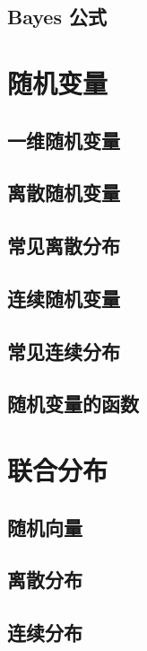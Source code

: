 \documentclass[zihao=-4,linespread=1.5,a4paper,heading=true,oneside]{ctexbook}
\theoremstyle{definition}
\begin{document}
\section{Bayes 公式}\label{sec:1.8}


\chapter{随机变量}\label{chap:2}
\section{一维随机变量}\label{sec:2.1}

\section{离散随机变量}\label{sec:2.2}

\section{常见离散分布}\label{sec:2.3}

\section{连续随机变量}\label{sec:2.4}

\section{常见连续分布}\label{sec:2.5}

\section{随机变量的函数}\label{sec:2.6}


\chapter{联合分布}\label{chap:3}
\section{随机向量}\label{sec:3.1}

\section{离散分布}\label{sec:3.2}

\section{连续分布}\label{sec:3.3}

\end{document}

